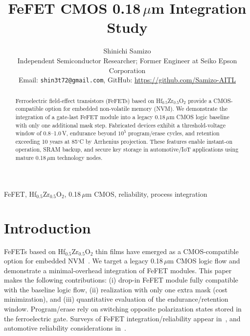 \documentclass[journal]{IEEEtran}
\newcommand{\HZO}{Hf$_{0.5}$Zr$_{0.5}$O$_2$}
\begin{document}
\title{FeFET CMOS 0.18\,$\mu$m Integration Study}
\author{Shinichi Samizo\\
\small Independent Semiconductor Researcher; Former Engineer at Seiko Epson Corporation\\
\small Email: \texttt{shin3t72@gmail.com}, GitHub: \href{https://github.com/Samizo-AITL}{https://github.com/Samizo-AITL}}
\maketitle

\begin{abstract}
Ferroelectric field-effect transistors (FeFETs) based on \HZO{} provide a CMOS-compatible option for embedded non-volatile memory (NVM). We demonstrate the integration of a gate-last FeFET module into a legacy 0.18\,$\mu$m CMOS logic baseline with only one additional mask step. Fabricated devices exhibit a threshold-voltage window of 0.8--1.0\,V, endurance beyond $10^5$ program/erase cycles, and retention exceeding 10 years at 85$^\circ$C by Arrhenius projection. These features enable instant-on operation, SRAM backup, and secure key storage in automotive/IoT applications using mature 0.18\,$\mu$m technology nodes.
\end{abstract}

\begin{IEEEkeywords}
FeFET, \HZO, 0.18\,$\mu$m CMOS, reliability, process integration
\end{IEEEkeywords}

\section{Introduction}
FeFETs based on \HZO{} thin films have emerged as a CMOS-compatible option for embedded NVM~\cite{Boscke2011,Mueller2012,Schenk2019}. We target a legacy 0.18\,$\mu$m CMOS logic flow and demonstrate a minimal-overhead integration of FeFET modules. This paper makes the following contributions: (i) drop-in FeFET module fully compatible with the baseline logic flow, (ii) realization with only one extra mask (cost minimization), and (iii) quantitative evaluation of the endurance/retention window. Program/erase rely on switching opposite polarization states stored in the ferroelectric gate. Surveys of FeFET integration/reliability appear in~\cite{Mueller2015,Park2020}, and automotive reliability considerations in~\cite{Nakamura2003}.
\end{document}
